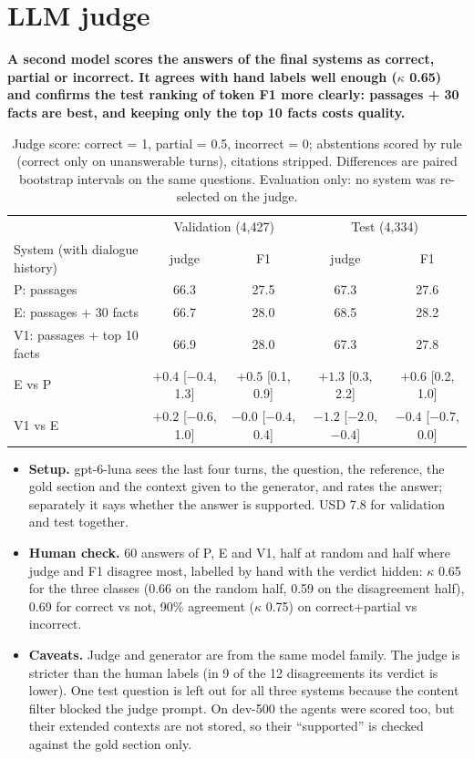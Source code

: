 \documentclass[11pt,a4paper]{article}
\begin{document}
\section{LLM judge}\label{sec:judge}

\textbf{A second model scores the answers of the final systems as correct, partial or incorrect. It agrees
with hand labels well enough ($\kappa$ 0.65) and confirms the test ranking of token F1 more clearly:
passages + 30 facts are best, and keeping only the top 10 facts costs quality.}

\begin{table}[H]
\centering\small\setlength{\tabcolsep}{4pt}
\begin{tabular}{lcccc}
\toprule
 & \multicolumn{2}{c}{Validation (4,427)} & \multicolumn{2}{c}{Test (4,334)} \\
System (with dialogue history) & judge & F1 & judge & F1 \\
\midrule
P: passages & 66.3 & 27.5 & 67.3 & 27.6 \\
E: passages + 30 facts & 66.7 & 28.0 & 68.5 & 28.2 \\
V1: passages + top 10 facts & 66.9 & 28.0 & 67.3 & 27.8 \\
\midrule
E vs P & $+0.4$ [$-0.4$, 1.3] & $+0.5$ [0.1, 0.9] & $+1.3$ [0.3, 2.2] & $+0.6$ [0.2, 1.0] \\
V1 vs E & $+0.2$ [$-0.6$, 1.0] & $-0.0$ [$-0.4$, 0.4] & $-1.2$ [$-2.0$, $-0.4$] & $-0.4$ [$-0.7$, 0.0] \\
\bottomrule
\end{tabular}
\caption{Judge score: correct = 1, partial = 0.5, incorrect = 0; abstentions scored by rule (correct only on
unanswerable turns), citations stripped. Differences are paired bootstrap intervals on the same questions.
Evaluation only: no system was re-selected on the judge.}
\label{tab:judge}
\end{table}

\begin{itemize}
\item \textbf{Setup.} gpt-6-luna sees the last four turns, the question, the reference, the gold section and the
  context given to the generator, and rates the answer; separately it says whether the answer is supported.
  USD 7.8 for validation and test together.
\item \textbf{Human check.} 60 answers of P, E and V1, half at random and half where judge and F1 disagree most,
  labelled by hand with the verdict hidden: $\kappa$ 0.65 for the three classes (0.66 on the random half, 0.59
  on the disagreement half), 0.69 for correct vs not, 90\% agreement ($\kappa$ 0.75) on correct+partial vs
  incorrect.
\item \textbf{Caveats.} Judge and generator are from the same model family. The judge is stricter than the
  human labels (in 9 of the 12 disagreements its verdict is lower). One test question is left out for all
  three systems because the content filter blocked the judge prompt. On dev-500 the agents were scored too, but
  their extended contexts are not stored, so their ``supported'' is checked against the gold section only.
\end{itemize}
\end{document}
